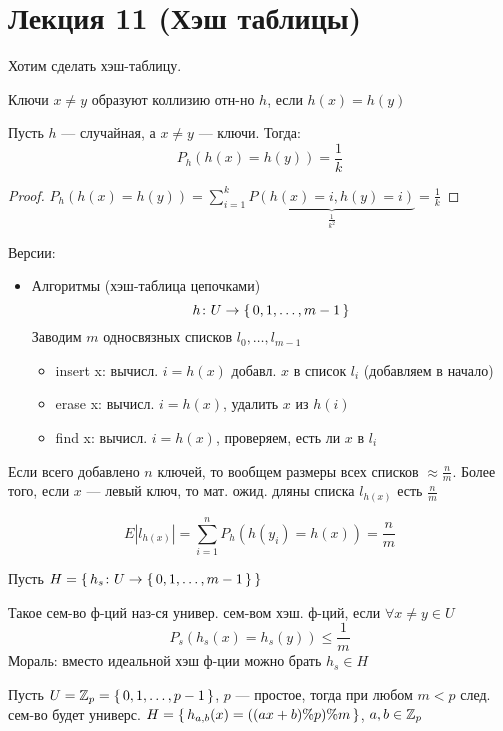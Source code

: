 \section{Лекция 11 (Хэш таблицы)}
Хотим сделать хэш-таблицу.
\begin{definition}
Ключи $x \neq y$  образуют коллизию отн-но $h$, если $h(x) = h(y)$
\end{definition}
\begin{note}
Пусть $h$ --- случайная, а $x \neq y$ --- ключи. Тогда:
\[
P_h(h(x) = h(y)) = \frac{1}{k}
\]
\end{note}
\begin{proof}
$P_h(h(x) = h(y)) = \sum_{i = 1}^{k} \underbrace{P(h(x) = i, h(y) = i)}_{\frac{1}{k^{2}}} = \frac{1}{k}$ 
\end{proof}
Версии:
\begin{itemize}
  \item Алгоритмы (хэш-таблица цепочками)
    \[
    h \colon U \rightarrow \set{0, 1, \ldots, m - 1}
    \]
    Заводим $m$ односвязных списков $l_0, \ldots, l_{m - 1}$
    \begin{itemize}
      \item insert x: вычисл. $i = h(x)$ добавл. $x$ в список $l_i$ (добавляем в начало)
      \item erase x: вычисл. $i = h(x)$, удалить $x$ из $h(i)$
      \item find x: вычисл. $i = h(x)$, проверяем, есть ли $x$ в $l_i$
    \end{itemize}
\end{itemize}
\begin{note}
Если всего добавлено $n$ ключей, то вообщем размеры всех списков $\approx \frac{n}{m}$. Более того, если $x$ --- левый ключ, то мат. ожид. дляны списка $l_{h(x)}$ есть $\frac{n}{m}$
\end{note}
\[
E\left|l_{h(x)}\right| = \sum_{i = 1}^{n} P_{h}(h(y_i) = h(x)) = \frac{n}{m}
\]
\begin{definition}
Пусть $H = \set{h_s \colon U \rightarrow \set{0, 1, \ldots, m - 1}}$
\end{definition}
Такое сем-во ф-ций наз-ся универ. сем-вом хэш. ф-ций, если $\forall x \neq y\in U$
\[
P_s(h_s(x) = h_s(y)) \leq \frac{1}{m}
\]
Мораль: вместо идеальной хэш ф-ции можно брать $h_s \in H$
\begin{statement}
Пусть $U = \mathbb{Z}_p = \set{0, 1, \ldots, p - 1}$, $p$ --- простое, тогда при любом $m < p$ след. сем-во будет универс. $H = \set{h_{a, b}(x) = ((a x + b) \% p) \% m}$, $a, b \in \mathbb{Z}_p$
\end{statement}
